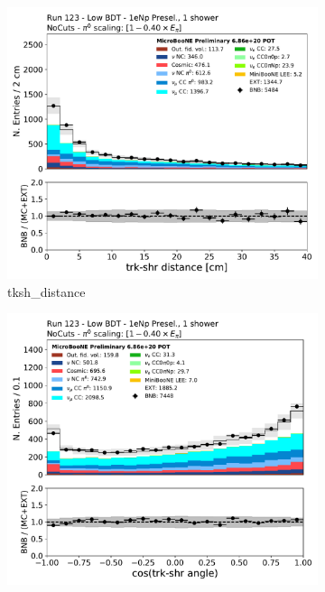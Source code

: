 \begin{figure}[H]
    \centering
    \begin{subfigure}{0.3\textwidth}
    \includegraphics[width=1.0\textwidth]{Sidebands/Figures/1eNp/LPID_NPOneShr_None_pi0e40/tksh_distance.pdf}
    \caption{tksh\_distance}
    \end{subfigure}
    \begin{subfigure}{0.3\textwidth}
    \includegraphics[width=1.0\textwidth]{Sidebands/Figures/1eNp/LPID_NPOneShr_None_pi0e40/tksh_angle.pdf}

\end{subfigure}
\end{figure}
